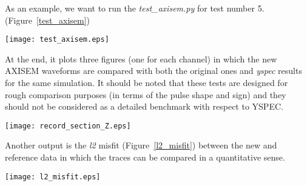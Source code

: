 \documentclass[11pt,letter,fleqn,english,notitlepage]{article}
\begin{document}
\noindent As an example, we want to run the \textit{test\_axisem.py} for test number 5. (Figure~\ref{test_axisem})

\begin{figure*}[htb]
\begin{center}
\texttt{[image: test\_axisem.eps]}
\caption{\textit{Screenshot while running test\_axisem.py}}
\end{center}
\label{test_axisem}
\end{figure*}

\noindent At the end, it plots three figures (one for each channel) 
in which the new AXISEM waveforms are compared with both the original ones and \textit{yspec} results for the same simulation.
It should be noted that these tests are designed for rough comparison purposes (in terms of the pulse shape and sign) and they should not be considered as a detailed benchmark with respect to YSPEC. \\

\begin{figure*}[htb]
\begin{center}
\texttt{[image: record\_section\_Z.eps]}
\caption{\textit{Comparing new AXISEM results with the reference solution and \textit{yspec} waveforms. (Z channel)}}
\end{center}
\label{channel_Z}
\end{figure*}

\noindent Another output is the \textit{l2} misfit (Figure~\ref{l2_misfit}) between the new and reference data 
in which the traces can be compared in a quantitative sense.

\begin{figure*}[htb]
\begin{center}
\texttt{[image: l2\_misfit.eps]}
\caption{\textit{l2 misfit between the new and reference data.}}
\end{center}
\label{l2_misfit}
\end{figure*}
\end{document}
